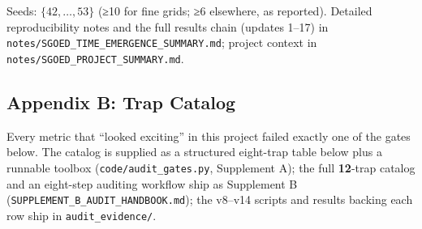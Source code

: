 Seeds: \(\{42,\dots,53\}\) (≥10 for fine grids; ≥6 elsewhere, as
reported). Detailed reproducibility notes and the full results chain
(updates 1--17) in \texttt{notes/SGOED\_TIME\_EMERGENCE\_SUMMARY.md};
project context in \texttt{notes/SGOED\_PROJECT\_SUMMARY.md}.

\subsection{Appendix B: Trap Catalog}\label{appendix-b-trap-catalog}

Every metric that ``looked exciting'' in this project failed exactly one
of the gates below. The catalog is supplied as a structured eight-trap
table below plus a runnable toolbox (\texttt{code/audit\_gates.py},
Supplement A); the full \textbf{12}-trap catalog and an eight-step
auditing workflow ship as Supplement B
(\texttt{SUPPLEMENT\_B\_AUDIT\_HANDBOOK.md}); the v8--v14 scripts and
results backing each row ship in \texttt{audit\_evidence/}.

